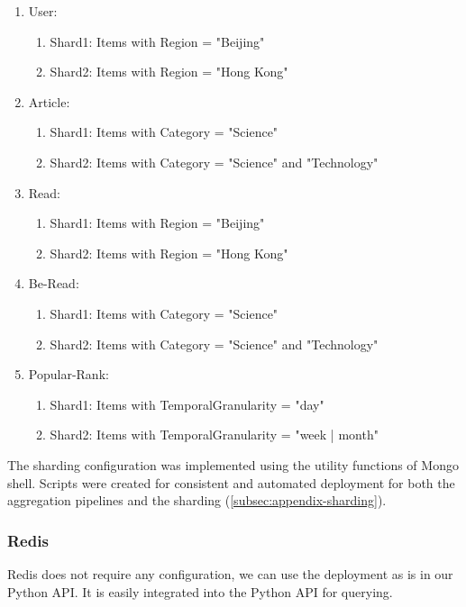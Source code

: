 \documentclass{article}
\begin{document}
    \begin{enumerate}
        \item User: 
        \begin{enumerate}
            \item Shard1: Items with Region = "Beijing"
            \item Shard2: Items with Region = "Hong Kong"
        \end{enumerate}
        \item Article: 
        \begin{enumerate}
            \item Shard1: Items with Category = "Science"
            \item Shard2: Items with Category = "Science" and "Technology"
        \end{enumerate}
        \item Read: 
        \begin{enumerate}
            \item Shard1: Items with Region = "Beijing"
            \item Shard2: Items with Region = "Hong Kong"
        \end{enumerate}
        \item Be-Read: 
        \begin{enumerate}
            \item Shard1: Items with Category = "Science"
            \item Shard2: Items with Category = "Science" and "Technology"
        \end{enumerate}
        \item Popular-Rank: 
        \begin{enumerate}
            \item Shard1: Items with TemporalGranularity = "day"
            \item Shard2: Items with TemporalGranularity = "week | month"
        \end{enumerate}
    \end{enumerate}
    The sharding configuration was implemented using the utility functions of Mongo shell. Scripts were created for consistent and automated deployment for both the aggregation pipelines and the sharding (\ref{subsec:appendix-sharding}).
   
    \subsubsection{Redis}
    Redis does not require any configuration, we can use the deployment as is in our Python API. It is easily integrated into the Python API for querying. 
\end{document}

